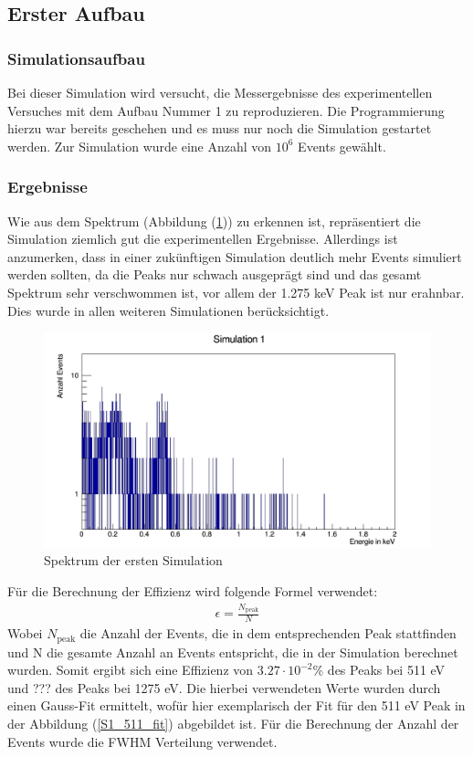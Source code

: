 \documentclass[a4paper,11pt,twoside]{article}
\begin{document}
	\subsection{Erster Aufbau}
		\subsubsection{Simulationsaufbau}
		Bei dieser Simulation wird versucht, die Messergebnisse des experimentellen Versuches mit dem Aufbau Nummer 1 zu reproduzieren. Die Programmierung hierzu war bereits geschehen und es muss nur noch die Simulation gestartet werden. Zur Simulation wurde eine Anzahl von $10^6$ Events gewählt. 
		
		
		\subsubsection{Ergebnisse}
		Wie aus dem Spektrum (Abbildung (\ref{S1_ganz})) zu erkennen ist, repräsentiert die Simulation ziemlich gut die experimentellen Ergebnisse. Allerdings ist anzumerken, dass in einer zukünftigen Simulation deutlich mehr Events simuliert werden sollten, da die Peaks nur schwach ausgeprägt sind und das gesamt Spektrum sehr verschwommen ist, vor allem der 1.275 keV Peak ist nur erahnbar. Dies wurde in allen weiteren Simulationen berücksichtigt. 
		
		 
\begin{figure}[H]
	\begin{center}
		\includegraphics[width=0.7\linewidth]{Simulation1_ganz}
		\caption{Spektrum der ersten Simulation}
		\label{S1_ganz}
	\end{center}
\end{figure}	

Für die Berechnung der Effizienz wird folgende Formel verwendet:
\begin{align}
	\epsilon = \frac{N_{\textrm{peak}}}{N}
\end{align}
Wobei $N_\textrm{peak}$ die Anzahl der Events, die in dem entsprechenden Peak stattfinden und N die gesamte Anzahl an Events entspricht, die in der Simulation berechnet wurden. Somit ergibt sich eine Effizienz von $3.27\cdot 10^{-2}\%$ des Peaks bei 511 eV und {\color{Red}???} des Peaks bei 1275 eV. Die hierbei verwendeten Werte wurden durch einen Gauss-Fit ermittelt, wofür hier exemplarisch der Fit für den 511 eV Peak in der Abbildung (\ref{S1_511_fit}) abgebildet ist. Für die Berechnung der Anzahl der Events wurde die FWHM Verteilung verwendet.   
		
\end{document}
